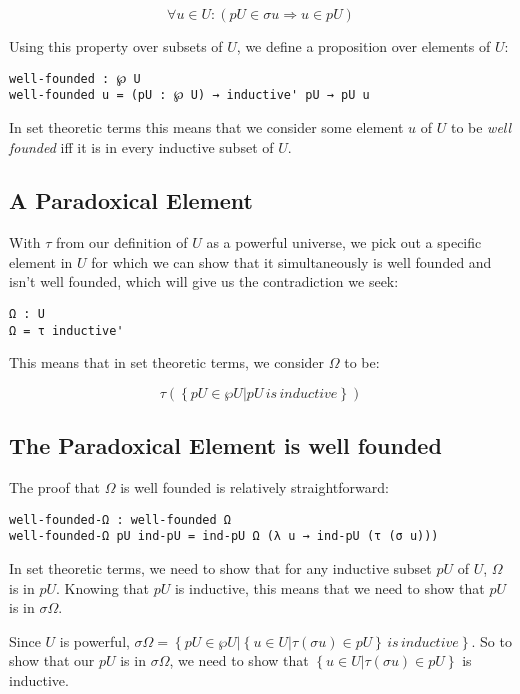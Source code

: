 \documentclass[runningheads]{llncs}
\begin{document}
$$
\forall u \in U: \left ( pU \in \sigma u \Rightarrow u \in pU \right )
$$

Using this property over subsets of $U$, we define a proposition over elements
of $U$:

\begin{verbatim}
well-founded : ℘ U
well-founded u = (pU : ℘ U) → inductive' pU → pU u
\end{verbatim}

In set theoretic terms this means that we consider some element $u$ of $U$ to be
\textit{well founded} iff it is in every inductive subset of $U$.

\subsection{A Paradoxical Element}

With $\tau$ from our definition of $U$ as a powerful universe, we pick out a
specific element in $U$ for which we can show that it simultaneously is well
founded and isn't well founded, which will give us the contradiction we seek:

\begin{verbatim}
Ω : U
Ω = τ inductive'
\end{verbatim}

This means that in set theoretic terms, we consider $\Omega$ to be:

$$
\tau \left ( \left \{ pU \in \wp U | pU \, is \, inductive \right \} \right )
$$

\subsection{The Paradoxical Element is well founded}

The proof that $\Omega$ is well founded is relatively straightforward:

\begin{verbatim}
well-founded-Ω : well-founded Ω
well-founded-Ω pU ind-pU = ind-pU Ω (λ u → ind-pU (τ (σ u)))
\end{verbatim}

In set theoretic terms, we need to show that for any inductive subset $pU$ of
$U$, $\Omega$ is in $pU$. Knowing that $pU$ is inductive, this means that we
need to show that $pU$ is in $\sigma \Omega$.

Since $U$ is powerful, $\sigma \Omega = \left \{ pU \in \wp U | \left \{ u \in U
| \tau (\sigma u) \in pU \right \} \, is \, inductive \right \}$. So to show
that our $pU$ is in $\sigma \Omega$, we need to show that $\left \{ u \in U |
\tau (\sigma u) \in pU \right \}$ is inductive.
\end{document}
